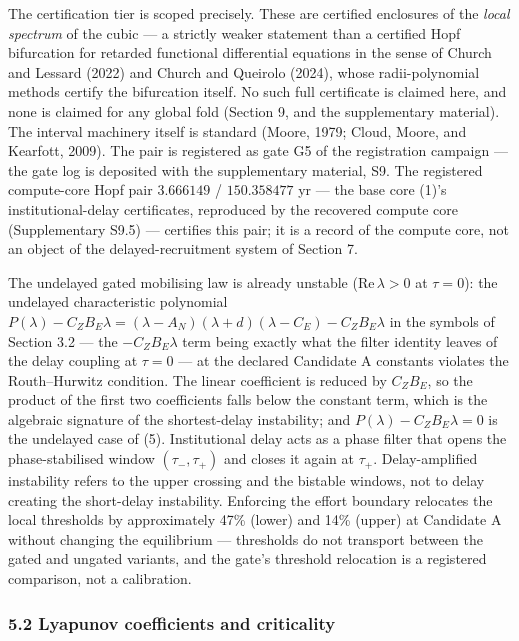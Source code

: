 \documentclass[11pt]{article}
\begin{document}
The certification tier is scoped precisely. These are certified
enclosures of the \emph{local spectrum} of the cubic --- a strictly
weaker statement than a certified Hopf bifurcation for retarded
functional differential equations in the sense of Church and Lessard
(2022) and Church and Queirolo (2024), whose radii-polynomial methods
certify the bifurcation itself. No such full certificate is claimed
here, and none is claimed for any global fold (Section 9, and the
supplementary material). The interval machinery itself is standard
(Moore, 1979; Cloud, Moore, and Kearfott, 2009). The pair is registered
as gate G5 of the registration campaign --- the gate log is deposited
with the supplementary material, S9. The registered compute-core Hopf
pair \(3.666149\) / \(150.358477\) yr --- the base core (1)'s
institutional-delay certificates, reproduced by the recovered compute
core (Supplementary S9.5) --- certifies this pair; it is a record of the
compute core, not an object of the delayed-recruitment system of Section
7.

The undelayed gated mobilising law is already unstable
(\(\mathrm{Re}\,\lambda > 0\) at \(\tau = 0\)): the undelayed
characteristic polynomial
\(P(\lambda) - C_Z B_E\lambda = (\lambda - A_N)(\lambda + d)(\lambda - C_E) - C_Z B_E\lambda\)
in the symbols of Section 3.2 --- the \(-C_Z B_E\lambda\) term being
exactly what the filter identity leaves of the delay coupling at
\(\tau = 0\) --- at the declared Candidate A constants violates the
Routh--Hurwitz condition. The linear coefficient is reduced by
\(C_Z B_E\), so the product of the first two coefficients falls below
the constant term, which is the algebraic signature of the
shortest-delay instability; and \(P(\lambda) - C_Z B_E\lambda = 0\) is
the undelayed case of (5). Institutional delay acts as a phase filter
that opens the phase-stabilised window \((\tau_-, \tau_+)\) and closes
it again at \(\tau_+\). Delay-amplified instability refers to the upper
crossing and the bistable windows, not to delay creating the short-delay
instability. Enforcing the effort boundary relocates the local
thresholds by approximately 47\% (lower) and 14\% (upper) at Candidate A
without changing the equilibrium --- thresholds do not transport between
the gated and ungated variants, and the gate's threshold relocation is a
registered comparison, not a calibration.

\subsubsection{5.2 Lyapunov coefficients and
criticality}\label{lyapunov-coefficients-and-criticality}
\end{document}
